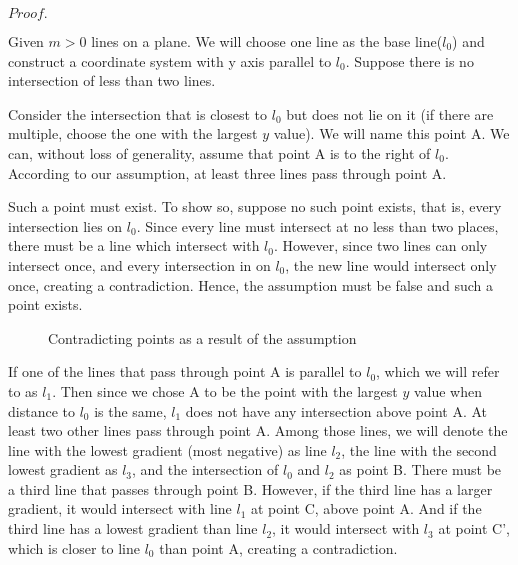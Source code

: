 \documentclass[a4paper, 12pt]{article}
\def\mypindent{1.35cm}
\newenvironment{my_indent}
 {\par\begingroup\leftskip\mypindent}
 {\par\endgroup}
\newcommand{\mycorf}{
    \leftskip-\mypindent
    \captionsetup{margin={-\mypindent,\mypindent}}}
\newcommand{\myproof}{
\vspace{-\parskip}$Proof.$\vspace{\dimexpr-\parskip-\baselineskip}}
\begin{document}
\myproof
\begin{my_indent}
Given $m>0$ lines on a plane. We will choose one line as the base line($l_0$) and construct a coordinate system with y axis parallel to $l_0$. Suppose there is no intersection of less than two lines. 

Consider the intersection that is closest to $l_0$ but does not lie on it (if there are multiple, choose the one with the largest $y$ value). We will name this point A. We can, without loss of generality, assume that point A is to the right of $l_0$. According to our assumption, at least three lines pass through point A.

Such a point must exist. To show so, suppose no such point exists, that is, every intersection lies on $l_0$. Since every line must intersect at no less than two places, there must be a line which intersect with $l_0$. However, since two lines can only intersect once, and every intersection in on $l_0$, the new line would intersect only once, creating a contradiction. Hence, the assumption must be false and such a point exists.

\begin{wrapfigure}{r}{0.25\textwidth}
    \mycorf
    \vspace{-2.5\baselineskip}
    
    \caption{Contradicting points as a result of the assumption}
    \label{fig:triple_intersect_para_1}
    \vspace{-2\baselineskip}
\end{wrapfigure}
If one of the lines that pass through point A is parallel to $l_0$, which we will refer to as $l_1$. Then since we chose A to be the point with the largest $y$ value when distance to $l_0$ is the same, $l_1$ does not have any intersection above point A. At least two other lines pass through point A. Among those lines, we will denote the line with the lowest gradient (most negative) as line $l_2$, the line with the second lowest gradient as $l_3$, and the intersection of $l_0$ and $l_2$ as point B. There must be a third line that passes through point B. However, if the third line has a larger gradient, it would intersect with line $l_1$ at point C, above point A. And if the third line has a lowest gradient than line $l_2$, it would intersect with $l_3$ at point C', which is closer to line $l_0$ than point A, creating a contradiction.


\end{my_indent}
\end{document}
